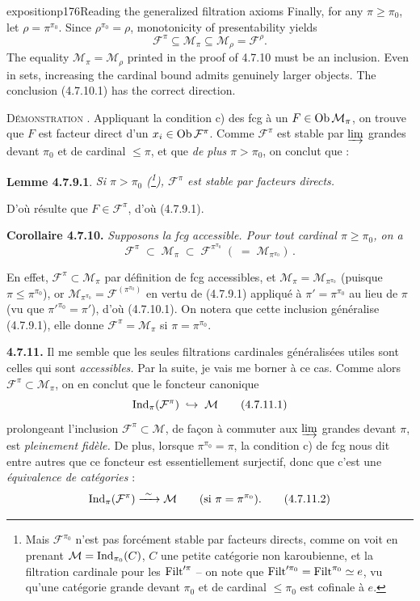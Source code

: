 \begin{dcomment}{exposition}{p176}{Reading the generalized filtration axioms}
Finally, for any $\pi\geq\pi_0$, let $\rho=\pi^{\pi_0}$. Since $\rho^{\pi_0}=\rho$, monotonicity of presentability yields
\[
 \mathcal F^\pi\subseteq\mathcal M_\pi
 \subseteq\mathcal M_\rho=\mathcal F^\rho.
\]
The equality $\mathcal M_\pi=\mathcal M_\rho$ printed in the proof of 4.7.10 must be an inclusion. Even in sets, increasing the cardinal bound admits genuinely larger objects. The conclusion (4.7.10.1) has the correct direction.
\end{dcomment}


\textsc{Démonstration} . Appliquant la condition c) des fcg à un $F\in\operatorname{Ob}\mathcal{M}_\pi$, on trouve que $F$ est facteur direct d'un $x_i\in\operatorname{Ob}\mathcal{F}^{\pi}$. Comme $\mathcal{F}^{\pi}$ est stable par $\varinjlim$ grandes devant $\pi_0$ et de cardinal $\leqslant\pi$, et que \textit{de plus} $\pi>\pi_0$, on conclut que :

\textbf{Lemme 4.7.9.1}. \textit{Si $\pi>\pi_0$ (\footnote[76]{Mais $\mathcal{F}^{\pi_0}$ n'est pas forcément stable par facteurs directs, comme on voit en prenant $\mathcal{M}=\operatorname{Ind}_{\pi_0}(C)$, $C$ une petite catégorie non karoubienne, et la filtration cardinale pour les $\operatorname{Filt}'^{\pi}$ -- on note que $\operatorname{Filt}'^{\pi_0}=\operatorname{Filt}^{\pi_0}\simeq e$, vu qu'une catégorie grande devant $\pi_0$ et de cardinal $\leqslant\pi_0$ est cofinale à $e$.}), $\mathcal{F}^{\pi}$ est stable par facteurs directs.}

D'où résulte que $F\in\mathcal{F}^{\pi}$, d'où (4.7.9.1).

\textbf{Corollaire 4.7.10.} \textit{Supposons la fcg accessible. Pour tout cardinal $\pi\geqslant\pi_0$, on a}
\[
\mathcal{F}^{\pi} \;\subset\; \mathcal{M}_\pi \;\subset\; \mathcal{F}^{\pi^{\pi_0}} \; ( \;=\; \mathcal{M}_{\pi^{\pi_0}}) \, . \tag*{(4.7.10.1)}
\]

En effet, $\mathcal{F}^{\pi}\subset\mathcal{M}_\pi$ par définition de fcg accessibles, et $\mathcal{M}_\pi=\mathcal{M}_{\pi^{\pi_0}}$ (puisque $\pi\leqslant\pi^{\pi_0}$), or $\mathcal{M}_{\pi^{\pi_0}}=\mathcal{F}^{(\pi^{\pi_0})}$ en vertu de (4.7.9.1) appliqué à $\pi'=\pi^{\pi_0}$ au lieu de $\pi$ (vu que $\pi'^{\pi_0}=\pi'$), d'où (4.7.10.1). On notera que cette inclusion généralise (4.7.9.1), elle donne $\mathcal{F}^{\pi}=\mathcal{M}_\pi$ si $\pi=\pi^{\pi_0}$.

\textbf{4.7.11.} Il me semble que les seules filtrations cardinales généralisées utiles sont celles qui sont \textit{accessibles.} Par la suite, je vais me borner à ce cas. Comme alors $\mathcal{F}^{\pi}\subset\mathcal{M}_\pi$, on en conclut
que le foncteur canonique
\[
\operatorname{Ind}_\pi(\mathcal{F}^{\pi}) \;\hookrightarrow\; \mathcal{M} \tag*{(4.7.11.1)}
\]
prolongeant l'inclusion $\mathcal{F}^{\pi}\subset\mathcal{M}$, de façon à commuter aux $\varinjlim$ grandes devant $\pi$, est \textit{pleinement fidèle.} De plus, lorsque $\pi^{\pi_0}=\pi$, la condition c) de fcg nous dit entre autres que ce foncteur est essentiellement surjectif, donc que c'est une \textit{équivalence de catégories} :
\[
\Ind_\pi(\mathcal{F}^{\pi}) \xrightarrow{\ \sim\ } \mathcal{M} \qquad (\text{si } \pi=\pi^{\pi_0}). \tag*{(4.7.11.2)}
\]

